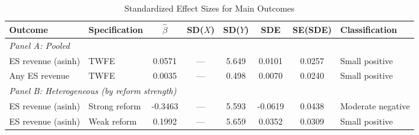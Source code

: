 \begin{table}[H]
\centering
\caption{Standardized Effect Sizes for Main Outcomes}
\label{tab:sde}
\begin{threeparttable}
\begin{adjustbox}{max width=\textwidth}
\begin{tabular}{llcccccl}
\toprule
Outcome & Specification & $\hat{\beta}$ & SD($X$) & SD($Y$) & SDE & SE(SDE) & Classification \\
\midrule
\multicolumn{8}{l}{\textit{Panel A: Pooled}} \\
ES revenue (asinh) & TWFE & 0.0571 & --- & 5.649 & 0.0101 & 0.0257 & Small positive \\
Any ES revenue & TWFE & 0.0035 & --- & 0.498 & 0.0070 & 0.0240 & Small positive \\
\midrule
\multicolumn{8}{l}{\textit{Panel B: Heterogeneous (by reform strength)}} \\
ES revenue (asinh) & Strong reform & -0.3463 & --- & 5.593 & -0.0619 & 0.0438 & Moderate negative \\
ES revenue (asinh) & Weak reform & 0.1992 & --- & 5.659 & 0.0352 & 0.0309 & Small positive \\
\bottomrule
\end{tabular}
\end{adjustbox}
\end{threeparttable}
\par\vspace{0.5em}

\end{table}
